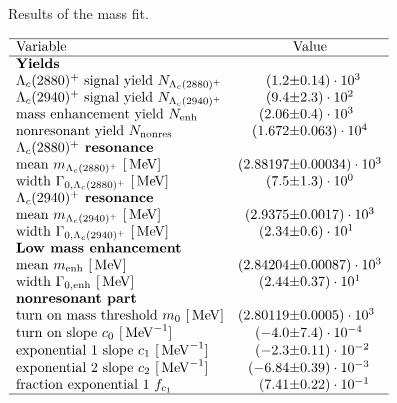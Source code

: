  
\begin{table}[tb]
    \centering
    \caption{Results of the \Dz\proton mass fit.}
    \label{tab:fit_mD0p_RS}
    $\begin{array}{lr@{\pm}l}
    \hline
    \text{Variable} & \multicolumn{2}{c}{\text{Value}} \\
    \hline
        \multicolumn{3}{l}{\text{\textbf{Yields}}} \\
\text{\LcResI signal yield $N_{\LcResI}$}&(1.2 & 0.14) \cdot 10^{3}\\
\text{\LcResII signal yield $N_{\LcResII}$}&(9.4 & 2.3) \cdot 10^{2}\\
\text{mass enhancement yield $N_{\text{enh}}$}&(2.06 & 0.4) \cdot 10^{3}\\
\text{nonresonant yield $N_{\text{nonres}}$}&(1.672 & 0.063) \cdot 10^{4}\\
\multicolumn{3}{l}{\text{\textbf{\LcResI resonance}}} \\
\text{mean $m_{\LcResI}$ $[\mev]$}&(2.88197 & 0.00034) \cdot 10^{3}\\
\text{width $\Gamma_{0, \LcResI}$ $[\mev]$}&(7.5 & 1.3) \cdot 10^{0}\\
\multicolumn{3}{l}{\text{\textbf{\LcResII resonance}}} \\
\text{mean $m_{\LcResII}$ $[\mev]$}&(2.9375 & 0.0017) \cdot 10^{3}\\
\text{width $\Gamma_{0, \LcResII}$ $[\mev]$}&(2.34 & 0.6) \cdot 10^{1}\\
\multicolumn{3}{l}{\text{\textbf{Low mass enhancement}}} \\
\text{mean $m_{\text{enh}}$ $[\mev]$}&(2.84204 & 0.00087) \cdot 10^{3}\\
\text{width $\Gamma_{0, \text{enh}}$ $[\mev]$}&(2.44 & 0.37) \cdot 10^{1}\\
\multicolumn{3}{l}{\text{\textbf{nonresonant part}}} \\
\text{turn on mass threshold $m_0$ $[\mev]$}&(2.80119 & 0.0005) \cdot 10^{3}\\
\text{turn on slope $c_0$ $[\mev^{-1}]$}&(-4.0 & 7.4) \cdot 10^{-4}\\
\text{exponential 1 slope $c_1$ $[\mev^{-1}]$}&(-2.3 & 0.11) \cdot 10^{-2}\\
\text{exponential 2 slope $c_2$ $[\mev^{-1}]$}&(-6.84 & 0.39) \cdot 10^{-3}\\
\text{fraction exponential 1 $f_{c_1}$}&(7.41 & 0.22) \cdot 10^{-1}\\

\hline
\end{array}$
\end{table}
    